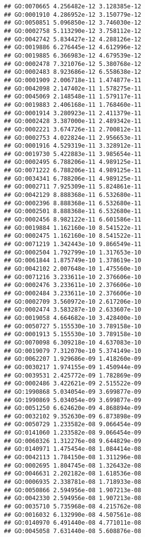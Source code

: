 \documentclass[
]{article}
\begin{document}
\begin{verbatim}
## GO:0070665 4.256482e-12 3.128385e-12
## GO:0001910 4.286952e-12 3.150779e-12
## GO:0050851 5.096850e-12 3.746030e-12
## GO:0002758 5.113290e-12 3.758112e-12
## GO:0042742 5.834427e-12 4.288126e-12
## GO:0019886 6.276445e-12 4.612996e-12
## GO:0019885 6.366983e-12 4.679539e-12
## GO:0002478 7.321076e-12 5.380768e-12
## GO:0002483 8.923686e-12 6.558638e-12
## GO:0001909 2.006718e-11 1.474877e-11
## GO:0042098 2.147402e-11 1.578275e-11
## GO:0045069 2.148548e-11 1.579117e-11
## GO:0019883 2.406168e-11 1.768460e-11
## GO:0001914 3.280923e-11 2.411379e-11
## GO:0002428 3.387000e-11 2.489342e-11
## GO:0002221 3.674726e-11 2.700812e-11
## GO:0002753 4.022824e-11 2.956653e-11
## GO:0001916 4.529319e-11 3.328912e-11
## GO:0019730 5.422883e-11 3.985654e-11
## GO:0002495 6.788206e-11 4.989125e-11
## GO:0071222 6.788206e-11 4.989125e-11
## GO:0034341 6.788206e-11 4.989125e-11
## GO:0002711 7.925309e-11 5.824861e-11
## GO:0042129 8.888368e-11 6.532680e-11
## GO:0002396 8.888368e-11 6.532680e-11
## GO:0002501 8.888368e-11 6.532680e-11
## GO:0002456 8.982122e-11 6.601586e-11
## GO:0019884 1.162160e-10 8.541522e-11
## GO:0002475 1.162160e-10 8.541522e-11
## GO:0071219 1.342443e-10 9.866549e-11
## GO:0002504 1.792799e-10 1.317653e-10
## GO:0061844 1.875749e-10 1.378619e-10
## GO:0042102 2.007648e-10 1.475560e-10
## GO:0071216 3.233611e-10 2.376606e-10
## GO:0002476 3.233611e-10 2.376606e-10
## GO:0002484 3.233611e-10 2.376606e-10
## GO:0002709 3.560972e-10 2.617206e-10
## GO:0002474 3.583287e-10 2.633607e-10
## GO:0019058 4.664682e-10 3.428400e-10
## GO:0050727 5.155530e-10 3.789158e-10
## GO:0001913 5.155530e-10 3.789158e-10
## GO:0070098 6.309218e-10 4.637083e-10
## GO:0019079 7.312070e-10 5.374149e-10
## GO:0062207 1.929686e-09 1.418260e-09
## GO:0030217 1.974155e-09 1.450944e-09
## GO:0039531 2.425772e-09 1.782869e-09
## GO:0002486 3.422621e-09 2.515522e-09
## GO:1990868 5.034054e-09 3.699877e-09
## GO:1990869 5.034054e-09 3.699877e-09
## GO:0051250 6.624620e-09 4.868894e-09
## GO:0032102 9.352630e-09 6.873898e-09
## GO:0050729 1.233582e-08 9.066454e-09
## GO:0141060 1.233582e-08 9.066454e-09
## GO:0060326 1.312276e-08 9.644829e-09
## GO:0140971 1.475454e-08 1.084414e-08
## GO:0042113 1.784150e-08 1.311296e-08
## GO:0002695 1.804745e-08 1.326432e-08
## GO:0046631 2.202182e-08 1.618536e-08
## GO:0006935 2.338781e-08 1.718933e-08
## GO:0050866 2.594956e-08 1.907213e-08
## GO:0042330 2.594956e-08 1.907213e-08
## GO:0035710 5.735968e-08 4.215762e-08
## GO:0016032 6.132990e-08 4.507561e-08
## GO:0140970 6.491440e-08 4.771011e-08
## GO:0045058 7.631440e-08 5.608876e-08

\end{verbatim}
\end{document}
